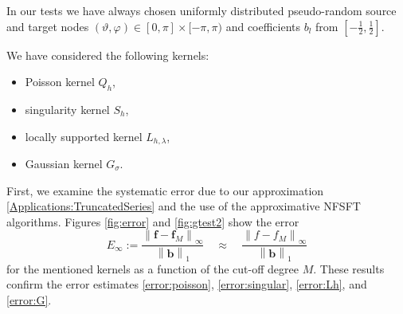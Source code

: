 \documentclass[11pt,a4paper,twoside,bibtotoc]{scrartcl}
\theoremstyle{plain}
\theoremstyle{definition}
\theoremstyle{remark}
\numberwithin{equation}{section}
\numberwithin{table}{section}
\numberwithin{figure}{section}
\begin{document}
In our tests we have always chosen uniformly distributed pseudo-random 
source and target nodes 
$\left(\vartheta,\varphi\right) \in [0,\pi] \times [-\pi,\pi)$ and 
coefficients $b_l$ from $\left[-\frac{1}{2},\frac{1}{2}\right]$.

We have considered the following kernels:

\begin{itemize}
  \item Poisson kernel $Q_{h}$,
  \item singularity kernel $S_{h}$,
  \item locally supported kernel $L_{h,\lambda}$,
  \item Gaussian kernel $G_{\sigma}$.
\end{itemize}

First, we examine the systematic error due to our approximation
\eqref{Applications:TruncatedSeries} and the use of the approximative NFSFT
algorithms. Figures \ref{fig:error} and \ref{fig:gtest2} show the error
\[
E_{\infty}:=
\frac{\left\|\mathbf{f}-\mathbf{f}_M\right\|_{\infty}}{\left\|\mathbf{b}\right\|_{1}}
\quad \approx \quad \frac{\left\|f-f_M\right\|_{\infty}}{\left\|\mathbf{b}\right\|_{1}}
\]
for the mentioned kernels as a function of the cut-off degree $M$.
These results confirm the error estimates \eqref{error:poisson},
\eqref{error:singular}, \eqref{error:Lh}, and \eqref{error:G}.
\end{document}
